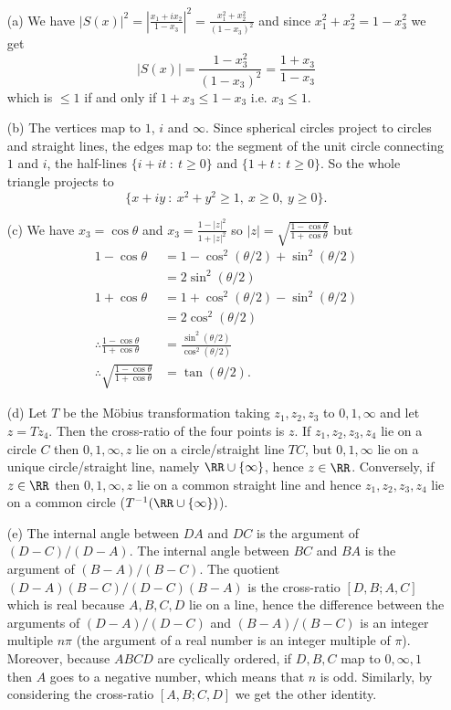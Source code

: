 \documentclass[12pt]{article}
\begin{document}
\begin{answer}
  \begin{enumerate}
  \item[(a)] We have $|S(x)|^2=\left|\frac{x_1+ix_2}{1-x_3}\right|^2=\frac{x_1^2+x_2^2}{(1-x_3)^2}$ and since $x_1^2+x_2^2=1-x_3^2$ we get
    \[|S(x)|=\frac{1-x_3^2}{(1-x_3)^2}=\frac{1+x_3}{1-x_3}\]
    which is $\leq 1$ if and only if $1+x_3\leq 1-x_3$ i.e. $x_3\leq 1$.
  \item[(b)] The vertices map to $1$, $i$ and $\infty$. Since spherical circles project to circles and straight lines, the edges map to: the segment of the unit circle connecting $1$ and $i$, the half-lines $\{i+it\ :\ t\geq 0\}$ and $\{1+t\ :\ t\geq 0\}$. So the whole triangle projects to
    \[\{x+iy\ :\ x^2+y^2\geq 1,\ x\geq 0,\ y\geq 0\}.\]
  \item[(c)] We have $x_3=\cos\theta$ and $x_3=\frac{1-|z|^2}{1+|z|^2}$ so $|z|=\sqrt{\frac{1-\cos\theta}{1+\cos\theta}}$ but
    \begin{align*}
      1-\cos\theta&=1-\cos^2(\theta/2)+\sin^2(\theta/2)\\
      &=2\sin^2(\theta/2)\\
      1+\cos\theta&=1+\cos^2(\theta/2)-\sin^2(\theta/2)\\
      &=2\cos^2(\theta/2)\\
      \therefore\frac{1-\cos\theta}{1+\cos\theta}&=\frac{\sin^2(\theta/2)}{\cos^2(\theta/2)}\\
      \therefore\sqrt{\frac{1-\cos\theta}{1+\cos\theta}}&=\tan(\theta/2).
    \end{align*}
  \item[(d)] Let $T$ be the M\"obius transformation taking $z_1,z_2,z_3$ to $0,1,\infty$ and let $z=Tz_4$. Then the cross-ratio of the four points is $z$. If $z_1,z_2,z_3,z_4$ lie on a circle $C$ then $0,1,\infty,z$ lie on a circle/straight line $TC$, but $0,1,\infty$ lie on a unique circle/straight line, namely $\RR\cup\{\infty\}$, hence $z\in\RR$. Conversely, if $z\in\RR$ then $0,1,\infty,z$ lie on a common straight line and hence $z_1,z_2,z_3,z_4$ lie on a common circle ($T^{-1}(\RR\cup\{\infty\})$).
  \item[(e)] The internal angle between $DA$ and $DC$ is the argument of $(D-C)/(D-A)$. The internal angle between $BC$ and $BA$ is the argument of $(B-A)/(B-C)$. The quotient $(D-A)(B-C)/(D-C)(B-A)$ is the cross-ratio $[D,B;A,C]$ which is real because $A,B,C,D$ lie on a line, hence the difference between the arguments of $(D-A)/(D-C)$ and $(B-A)/(B-C)$ is an integer multiple $n\pi$ (the argument of a real number is an integer multiple of $\pi$). Moreover, because $ABCD$ are cyclically ordered, if $D,B,C$ map to $0,\infty,1$ then $A$ goes to a negative number, which means that $n$ is odd. Similarly, by considering the cross-ratio $[A,B;C,D]$ we get the other identity.
  \end{enumerate}
\end{answer}
\fi
\end{document}
